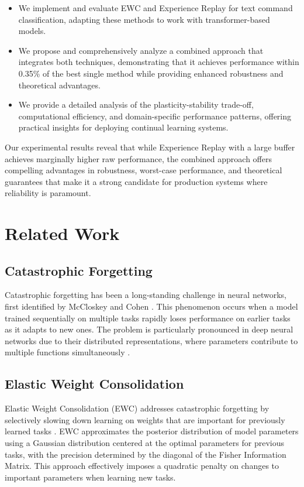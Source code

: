 \documentclass[conference]{IEEEtran}
\begin{document}
\begin{itemize}
    \item We implement and evaluate EWC and Experience Replay for text command classification, adapting these methods to work with transformer-based models.
    \item We propose and comprehensively analyze a combined approach that integrates both techniques, demonstrating that it achieves performance within 0.35\% of the best single method while providing enhanced robustness and theoretical advantages.
    \item We provide a detailed analysis of the plasticity-stability trade-off, computational efficiency, and domain-specific performance patterns, offering practical insights for deploying continual learning systems.
\end{itemize}

Our experimental results reveal that while Experience Replay with a large buffer achieves marginally higher raw performance, the combined approach offers compelling advantages in robustness, worst-case performance, and theoretical guarantees that make it a strong candidate for production systems where reliability is paramount.

\section{Related Work}
\subsection{Catastrophic Forgetting}
Catastrophic forgetting has been a long-standing challenge in neural networks, first identified by McCloskey and Cohen \cite{b3}. This phenomenon occurs when a model trained sequentially on multiple tasks rapidly loses performance on earlier tasks as it adapts to new ones. The problem is particularly pronounced in deep neural networks due to their distributed representations, where parameters contribute to multiple functions simultaneously \cite{b3}.

\subsection{Elastic Weight Consolidation}
Elastic Weight Consolidation (EWC) addresses catastrophic forgetting by selectively slowing down learning on weights that are important for previously learned tasks \cite{b1}. EWC approximates the posterior distribution of model parameters using a Gaussian distribution centered at the optimal parameters for previous tasks, with the precision determined by the diagonal of the Fisher Information Matrix. This approach effectively imposes a quadratic penalty on changes to important parameters when learning new tasks.
\end{document}
